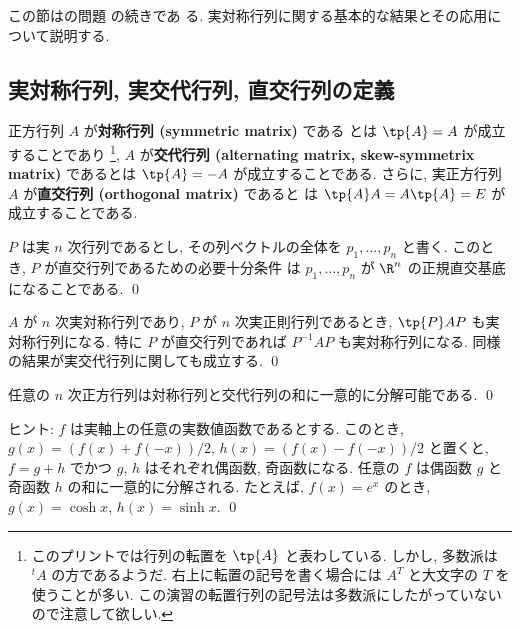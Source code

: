 \documentclass[12pt,twoside]{jarticle}
\begin{document}
この節はの問題  の続きであ
る.  実対称行列に関する基本的な結果とその応用について説明する.


\subsection{実対称行列, 実交代行列, 直交行列の定義}

正方行列 $A$ が{\bf 対称行列 (symmetric matrix)} である
とは $\tp{A}=A$ が成立することであり%
\footnote{このプリントでは行列の転置を $\tp{A}$ と表わしている. 
  しかし, 多数派は ${}^t\!A$ の方であるようだ.
  右上に転置の記号を書く場合には $A^T$ と大文字の $T$ を使うことが多い.
  この演習の転置行列の記号法は多数派にしたがっていないので注意して欲しい.}, 
$A$ が{\bf 交代行列 (alternating matrix, skew-symmetrix matrix)} 
であるとは $\tp{A}=-A$ が成立することである.
さらに, 実正方行列 $A$ が{\bf 直交行列 (orthogonal matrix)} であると
は $\tp{A}A=A\tp{A}=E$ が成立することである.


\begin{question}
  $P$ は実 $n$ 次行列であるとし, 
  その列ベクトルの全体を $p_1,\dots,p_n$ と書く.  
  このとき, $P$ が直交行列であるための必要十分条件
  は $p_1,\dots,p_n$ が $\R^n$ の正規直交基底になることである. \qed
\end{question}


\begin{question}
  $A$ が $n$ 次実対称行列であり, $P$ が $n$ 次実正則行列であるとき,
  $\tp{P}AP$ も実対称行列になる. 
  特に $P$ が直交行列であれば $P^{-1}AP$ も実対称行列になる.
  同様の結果が実交代行列に関しても成立する. \qed
\end{question}


\begin{question}
  任意の $n$ 次正方行列は対称行列と交代行列の和に一意的に分解可能である.
  \qed
\end{question}

\noindent
ヒント: $f$ は実軸上の任意の実数値函数であるとする. 
このとき, $g(x)=(f(x)+f(-x))/2$, $h(x)=(f(x)-f(-x))/2$ と置くと,
$f=g+h$ でかつ $g$, $h$ はそれぞれ偶函数, 奇函数になる.
任意の $f$ は偶函数 $g$ と奇函数 $h$ の和に一意的に分解される. 
たとえば, $f(x)=e^x$ のとき, $g(x)=\cosh x$, $h(x)=\sinh x$.
\qed
\end{document}
